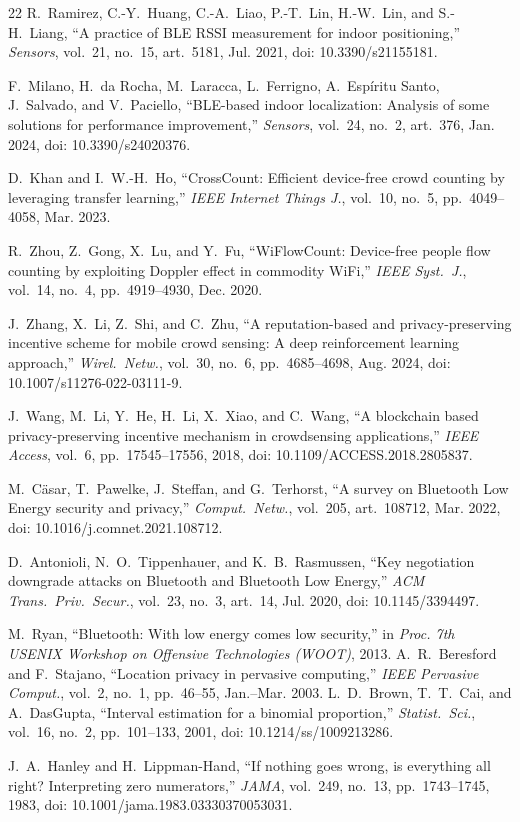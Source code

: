\documentclass[journal,10pt]{IEEEtran}
\begin{document}
{\begin{thebibliography}{22}
 R.~Ramirez, C.-Y.~Huang, C.-A.~Liao, P.-T.~Lin, H.-W.~Lin,
and S.-H.~Liang, ``A practice of BLE RSSI measurement for indoor positioning,''
\emph{Sensors}, vol.~21, no.~15, art.~5181, Jul. 2021, doi: 10.3390/s21155181.

 F.~Milano, H.~da Rocha, M.~Laracca, L.~Ferrigno,
A.~Esp\'iritu Santo, J.~Salvado, and V.~Paciello, ``BLE-based indoor
localization: Analysis of some solutions for performance improvement,''
\emph{Sensors}, vol.~24, no.~2, art.~376, Jan. 2024, doi: 10.3390/s24020376.

 D.~Khan and I.~W.-H.~Ho, ``CrossCount: Efficient device-free
crowd counting by leveraging transfer learning,'' \emph{IEEE Internet Things
J.}, vol.~10, no.~5, pp.~4049--4058, Mar. 2023.

 R.~Zhou, Z.~Gong, X.~Lu, and Y.~Fu, ``WiFlowCount:
Device-free people flow counting by exploiting Doppler effect in commodity
WiFi,'' \emph{IEEE Syst.\ J.}, vol.~14, no.~4, pp.~4919--4930, Dec. 2020.

 J.~Zhang, X.~Li, Z.~Shi, and C.~Zhu, ``A reputation-based
and privacy-preserving incentive scheme for mobile crowd sensing: A deep
reinforcement learning approach,'' \emph{Wirel.\ Netw.}, vol.~30, no.~6,
pp.~4685--4698, Aug. 2024, doi:
10.1007/s11276-022-03111-9.

 J.~Wang, M.~Li, Y.~He, H.~Li, X.~Xiao, and C.~Wang, ``A
blockchain based privacy-preserving incentive mechanism in crowdsensing
applications,'' \emph{IEEE Access}, vol.~6, pp.~17545--17556, 2018, doi:
10.1109/ACCESS.2018.2805837.

 M.~C\"asar, T.~Pawelke, J.~Steffan, and G.~Terhorst, ``A
survey on Bluetooth Low Energy security and privacy,'' \emph{Comput.\ Netw.},
vol.~205, art.~108712, Mar. 2022, doi: 10.1016/j.comnet.2021.108712.

 D.~Antonioli, N.~O.~Tippenhauer, and K.~B.~Rasmussen,
``Key negotiation downgrade attacks on Bluetooth and Bluetooth Low Energy,''
\emph{ACM Trans.\ Priv.\ Secur.}, vol.~23, no.~3, art.~14, Jul. 2020, doi:
10.1145/3394497.

 M.~Ryan, ``Bluetooth: With low energy comes low security,'' in \emph{Proc. 7th USENIX Workshop on Offensive Technologies (WOOT)}, 2013.
 A.~R.~Beresford and F.~Stajano, ``Location privacy in pervasive computing,'' \emph{IEEE Pervasive Comput.}, vol.~2, no.~1, pp.~46--55, Jan.--Mar. 2003.
 L.~D.~Brown, T.~T.~Cai, and A.~DasGupta, ``Interval
estimation for a binomial proportion,'' \emph{Statist.\ Sci.}, vol.~16, no.~2,
pp.~101--133, 2001, doi: 10.1214/ss/1009213286.

 J.~A.~Hanley and H.~Lippman-Hand, ``If nothing
goes wrong, is everything all right? Interpreting zero numerators,'' \emph{JAMA},
vol.~249, no.~13, pp.~1743--1745, 1983, doi: 10.1001/jama.1983.03330370053031.

\end{thebibliography}
}
\end{document}
